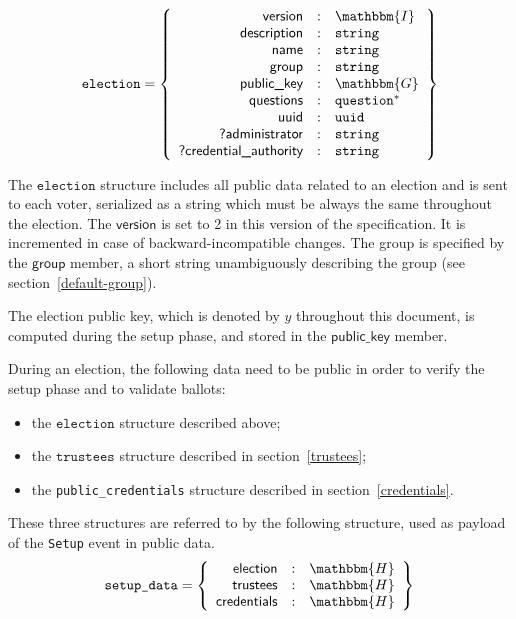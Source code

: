 \documentclass[a4paper]{article}
\newcommand{\G}{\mathbbm{G}}
\newcommand{\hash}{\mathbbm{H}}
\newcommand{\I}{\mathbbm{I}}
\newcommand{\jstring}{\texttt{string}}
\newcommand{\election}{\texttt{election}}
\begin{document}
\newcommand{\answer}{\texttt{answer}}
\newcommand{\signature}{\texttt{signature}}
\newcommand{\iproofs}{\textsf{individual\_proofs}}
\newcommand{\oproof}{\textsf{overall\_proof}}
\newcommand{\bproof}{\textsf{blank\_proof}}
\newcommand{\choices}{\textsf{choices}}
\newcommand{\iprove}{\textsf{iprove}}

\begin{gather*}
  \election=\left\{
    \begin{array}{rcl}
      \textsf{version}&:&\I\\
      \textsf{description}&:&\jstring\\
      \textsf{name}&:&\jstring\\
      \textsf{group}&:&\jstring\\
      \textsf{public\_key}&:&\G\\
      \textsf{questions}&:&\texttt{question}^\ast\\
      \textsf{uuid}&:&\texttt{uuid}\\
      \textsf{?administrator}&:&\jstring\\
      \textsf{?credential\_authority}&:&\jstring
    \end{array}
  \right\}
\end{gather*}

The $\election$ structure includes all public data related to an
election and is sent to each voter, serialized as a string which must
be always the same throughout the election. The $\textsf{version}$ is
set to 2 in this version of the specification. It is incremented in
case of backward-incompatible changes. The group is specified by the
$\textsf{group}$ member, a short string unambiguously describing the
group (see section~\ref{default-group}).

The election public key, which is denoted by $y$ throughout this
document, is computed during the setup phase, and stored in the
$\textsf{public\_key}$ member.

During an election, the following data need to be public in order to
verify the setup phase and to validate ballots:
\begin{itemize}
\item the $\election$ structure described above;
\item the $\texttt{trustees}$ structure described in
  section~\ref{trustees};
\item the \texttt{public\_credentials} structure described in
  section~\ref{credentials}.
\end{itemize}
These three structures are referred to by the following structure, used
as payload of the \texttt{Setup} event in public data.
\begin{gather*}
  \texttt{setup\_data}=\left\{
    \begin{array}{rcl}
      \textsf{election}&:&\hash\\
      \textsf{trustees}&:&\hash\\
      \textsf{credentials}&:&\hash
    \end{array}
  \right\}
\end{gather*}
\end{document}
